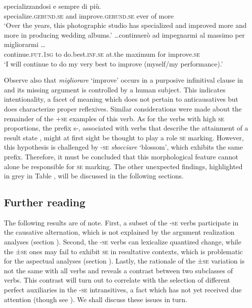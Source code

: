 \documentclass[output=paper,colorlinks,citecolor=brown
]{langscibook}
\begin{document}
\ea \label{bentley_example_7}
    \ea \label{bentley_example_7a}
     specializzandosi e  sempre di	più. \\
    {} specialize.\textsc{gerund}.\textsc{se} and improve.\textsc{gerund}.\textsc{se} ever of more\\
    \glt ‘Over the years, this photographic studio has specialized and improved more and more in producing wedding albums.’
    \ex \label{bentley_example_7b}
    \gll  \ldots  continuerò ad impegnarmi al massimo per migliorarmi \ldots  \\
    continue.\textsc{fut}.1\textsc{sg}	to do.best.\textsc{inf}.\textsc{se} at.the maximum for improve.\textsc{se} \\
    \glt ‘I will continue to do my very best to improve (myself/my performance).’
    \z
\z

Observe also that \textit{migliorare} ‘improve’ occurs in a purposive infinitival clause in  and its missing argument is controlled by a human subject. This indicates intentionality, a facet of meaning which does not pertain to anticausatives but does characterize proper reflexives. Similar considerations were made about the remainder of the +\textsc{se} examples of this verb. 
As for the verbs with high \textsc{se} proportions, the prefix s-, associated with verbs that describe the attainment of a result state \citep[112, 146, 159]{iacobini2004prefissazione}, might at first sight be thought to play a role \textsc{se} marking. However, this hypothesis is challenged by -\textsc{se} \textit{sbocciare} ‘blossom’, which exhibits the same prefix. Therefore, it must be concluded that this morphological feature cannot alone be responsible for \textsc{se} marking. The other unexpected findings, highlighted in grey in Table , will be discussed in the following sections.  

\subsection{Further reading}
\label{bentley_section_3.3}
The following results are of note. First, a subset of the -\textsc{se} verbs participate in the causative alternation, which is not explained by the argument realization analyses (section ). Second, the -\textsc{se} verbs can lexicalize quantized change, while the ±\textsc{se} ones may fail to exhibit \textsc{se} in resultative contexts, which is problematic for the aspectual analyses (section ). Lastly, the rationale of the ±\textsc{se} variation is not the same with all verbs and reveals a contrast between two subclasses of verbs. 
This contrast will turn out to correlate with the selection of different perfect auxiliaries in the -\textsc{se} intransitives, a fact which has not yet received due attention (though see \cite{bentley2021two}). We shall discuss these issues in turn.
\end{document}
